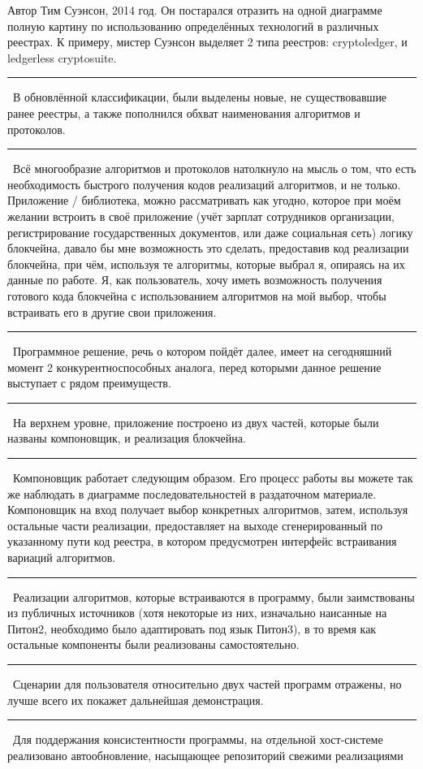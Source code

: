 \documentclass[12pt]{article}
\renewcommand{\line}{\noindent\rule{\textwidth}{1pt}}
\begin{document}
Автор Тим Суэнсон, 2014 год. Он постарался отразить на одной диаграмме полную
картину по использованию определённых технологий в различных реестрах. К
примеру, мистер Суэнсон выделяет 2 типа реестров: cryptoledger, и ledgerless
cryptosuite.\\
\line\
В обновлённой классификации, были выделены новые, не существовавшие ранее
реестры, а также пополнился обхват наименования алгоритмов и протоколов.\\
\line\
Всё многообразие алгоритмов и протоколов натолкнуло на мысль о том, что есть
необходимость быстрого получения кодов реализаций алгоритмов, и не только.
Приложение / библиотека, можно рассматривать как угодно, которое при моём
желании встроить в своё приложение (учёт зарплат сотрудников организации,
регистрирование государственных документов, или даже социальная сеть) логику
блокчейна, давало бы мне возможность это сделать, предоставив код реализации
блокчейна, при чём, используя те алгоритмы, которые выбрал я, опираясь на их
данные по работе. Я, как пользователь, хочу иметь возможность получения
готового кода блокчейна с использованием алгоритмов на мой выбор, чтобы
встраивать его в другие свои приложения.
\line\
Программное решение, речь о котором пойдёт далее, имеет на сегодняшний момент 2
конкурентноспособных аналога, перед которыми данное решение выступает с рядом
преимуществ.\\
\line\
На верхнем уровне, приложение построено из двух частей, которые были названы
компоновщик, и реализация блокчейна.\\
\line\
Компоновщик работает следующим образом. Его процесс работы вы можете так же
наблюдать в диаграмме последовательностей в раздаточном материале. Компоновщик
на вход получает выбор конкретных алгоритмов, затем, используя остальные части
реализации, предоставляет на выходе сгенерированный по указанному пути код
реестра, в котором предусмотрен интерфейс встраивания вариаций алгоритмов.\\
\line\
Реализации алгоритмов, которые встраиваются в программу, были заимствованы из
публичных источников (хотя некоторые из них, изначально наисанные на Питон2,
необходимо было адаптировать под язык Питон3), в то время как остальные
компоненты были реализованы самостоятельно.\\
\line\
Сценарии для пользователя относительно двух частей программ отражены, но лучше
всего их покажет дальнейшая демонстрация.\\
\line\
Для поддержания консистентности программы, на отдельной хост-системе
реализовано автообновление, насыщающее репозиторий свежими реализациями
\end{document}
